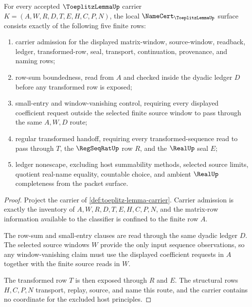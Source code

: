 \begin{theorem}\label{thm:toeplitz-lemma-namecert-obligations}
For every accepted $\ToeplitzLemmaUp$ carrier $K=(A,W,R,D,T,E,H,C,P,N)$, the local $\NameCert_{\ToeplitzLemmaUp}$ surface consists exactly of the following five finite rows:
\begin{enumerate}
\item carrier admission for the displayed matrix-window, source-window, readback, ledger, transformed-row, seal, transport, continuation, provenance, and naming rows;
\item row-sum boundedness, read from $A$ and checked inside the dyadic ledger $D$ before any transformed row is exposed;
\item small-entry and window-vanishing control, requiring every displayed coefficient request outside the selected finite source window to pass through the same $A,W,D$ route;
\item regular transformed handoff, requiring every transformed-sequence read to pass through $T$, the $\RegSeqRatUp$ row $R$, and the $\RealUp$ seal $E$;
\item ledger nonescape, excluding host summability methods, selected source limits, quotient real-name equality, countable choice, and ambient $\RealUp$ completeness from the packet surface.
\end{enumerate}
\end{theorem}
\begin{proof}
Project the carrier of \autoref{def:toeplitz-lemma-carrier}. Carrier admission is exactly the inventory of $A,W,R,D,T,E,H,C,P,N$, and the matrix-row information available to the classifier is confined to the finite row $A$.

The row-sum and small-entry clauses are read through the same dyadic ledger $D$. The selected source windows $W$ provide the only input sequence observations, so any window-vanishing claim must use the displayed coefficient requests in $A$ together with the finite source reads in $W$.

The transformed row $T$ is then exposed through $R$ and $E$. The structural rows $H,C,P,N$ transport, replay, source, and name this route, and the carrier contains no coordinate for the excluded host principles.
\end{proof}

